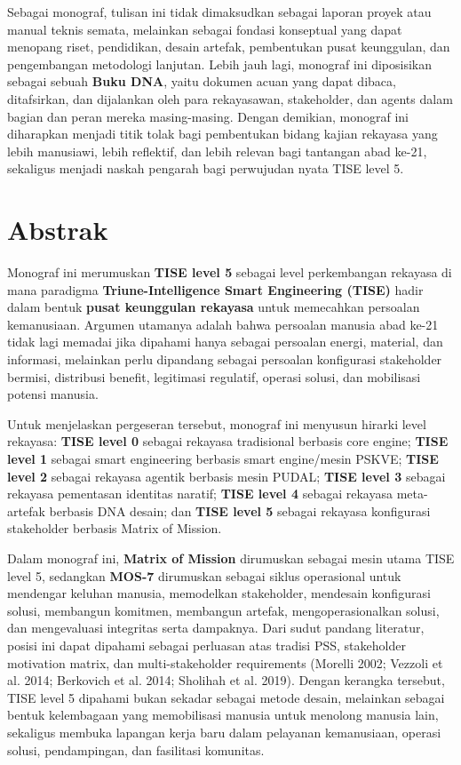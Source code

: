 \documentclass[
  letterpaper,
  DIV=11,
  numbers=noendperiod]{scrreprt}
\begin{document}
Sebagai monograf, tulisan ini tidak dimaksudkan sebagai laporan proyek
atau manual teknis semata, melainkan sebagai fondasi konseptual yang
dapat menopang riset, pendidikan, desain artefak, pembentukan pusat
keunggulan, dan pengembangan metodologi lanjutan. Lebih jauh lagi,
monograf ini diposisikan sebagai sebuah \textbf{Buku DNA}, yaitu dokumen
acuan yang dapat dibaca, ditafsirkan, dan dijalankan oleh para
rekayasawan, stakeholder, dan agents dalam bagian dan peran mereka
masing-masing. Dengan demikian, monograf ini diharapkan menjadi titik
tolak bagi pembentukan bidang kajian rekayasa yang lebih manusiawi,
lebih reflektif, dan lebih relevan bagi tantangan abad ke-21, sekaligus
menjadi naskah pengarah bagi perwujudan nyata TISE level 5.


\chapter*{Abstrak}\label{abstrak}


Monograf ini merumuskan \textbf{TISE level 5} sebagai level perkembangan
rekayasa di mana paradigma \textbf{Triune-Intelligence Smart Engineering
(TISE)} hadir dalam bentuk \textbf{pusat keunggulan rekayasa} untuk
memecahkan persoalan kemanusiaan. Argumen utamanya adalah bahwa
persoalan manusia abad ke-21 tidak lagi memadai jika dipahami hanya
sebagai persoalan energi, material, dan informasi, melainkan perlu
dipandang sebagai persoalan konfigurasi stakeholder bermisi, distribusi
benefit, legitimasi regulatif, operasi solusi, dan mobilisasi potensi
manusia.

Untuk menjelaskan pergeseran tersebut, monograf ini menyusun hirarki
level rekayasa: \textbf{TISE level 0} sebagai rekayasa tradisional
berbasis core engine; \textbf{TISE level 1} sebagai smart engineering
berbasis smart engine/mesin PSKVE; \textbf{TISE level 2} sebagai
rekayasa agentik berbasis mesin PUDAL; \textbf{TISE level 3} sebagai
rekayasa pementasan identitas naratif; \textbf{TISE level 4} sebagai
rekayasa meta-artefak berbasis DNA desain; dan \textbf{TISE level 5}
sebagai rekayasa konfigurasi stakeholder berbasis Matrix of Mission.

Dalam monograf ini, \textbf{Matrix of Mission} dirumuskan sebagai mesin
utama TISE level 5, sedangkan \textbf{MOS-7} dirumuskan sebagai siklus
operasional untuk mendengar keluhan manusia, memodelkan stakeholder,
mendesain konfigurasi solusi, membangun komitmen, membangun artefak,
mengoperasionalkan solusi, dan mengevaluasi integritas serta dampaknya.
Dari sudut pandang literatur, posisi ini dapat dipahami sebagai
perluasan atas tradisi PSS, stakeholder motivation matrix, dan
multi-stakeholder requirements (Morelli 2002; Vezzoli et al. 2014;
Berkovich et al. 2014; Sholihah et al. 2019). Dengan kerangka tersebut,
TISE level 5 dipahami bukan sekadar sebagai metode desain, melainkan
sebagai bentuk kelembagaan yang memobilisasi manusia untuk menolong
manusia lain, sekaligus membuka lapangan kerja baru dalam pelayanan
kemanusiaan, operasi solusi, pendampingan, dan fasilitasi komunitas.
\end{document}
